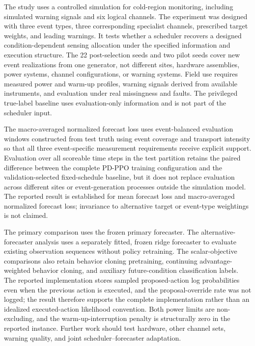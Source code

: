The study uses a controlled simulation for cold-region monitoring,
including simulated warning signals and six logical channels. The experiment was
designed with three event types, three corresponding specialist
channels, prescribed target weights, and leading warnings. It tests whether a
scheduler recovers a designed condition-dependent sensing allocation under the
specified information and execution structure. The 22 post-selection seeds and
two pilot seeds cover new event realizations from one generator, not different
sites, hardware assemblies, power systems, channel configurations, or warning
systems. Field use requires measured power and warm-up
profiles, warning signals derived from available instruments, and evaluation
under real missingness and faults. The privileged true-label baseline uses
evaluation-only information and is not part of the scheduler input.

The macro-averaged normalized forecast loss uses event-balanced evaluation
windows constructed from test truth using event coverage and transport intensity
so that all three event-specific measurement requirements receive explicit
support. Evaluation over all scoreable time steps in the test partition retains
the paired difference between the complete PD-PPO training configuration and the
validation-selected fixed-schedule baseline, but it does not replace evaluation
across different sites or event-generation processes outside the simulation
model. The reported result is established for mean forecast loss and
macro-averaged normalized forecast loss; invariance to alternative target or
event-type weightings is not claimed.

The primary comparison uses the frozen primary forecaster. The
alternative-forecaster analysis uses a separately fitted, frozen ridge
forecaster to evaluate existing observation sequences without policy retraining.
The scalar-objective comparisons also
retain behavior cloning pretraining, continuing advantage-weighted behavior
cloning, and auxiliary future-condition classification labels. The reported
implementation stores sampled proposed-action log probabilities even when the
previous action is executed, and the proposal-override rate was not logged; the
result therefore supports the complete implementation rather than an idealized
executed-action likelihood convention. Both power limits are non-excluding,
and the warm-up-interruption penalty is structurally zero in the reported
instance. Further work should test hardware, other channel sets, warning quality,
and joint scheduler--forecaster adaptation.
